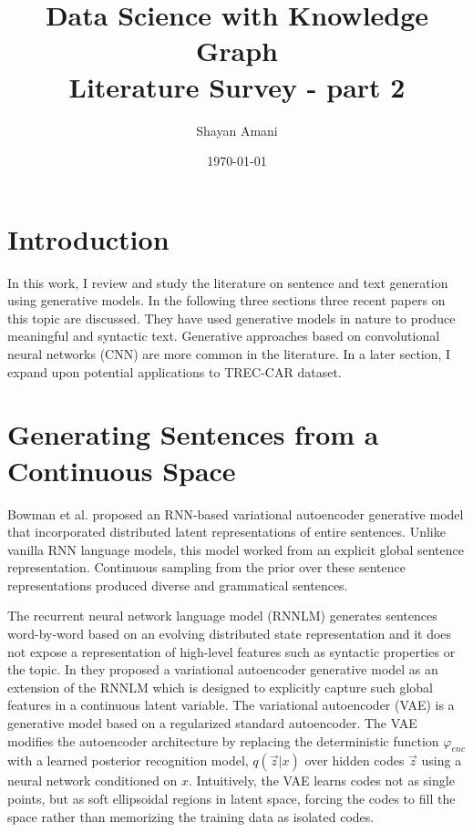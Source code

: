\documentclass[letterpaper,12pt]{article}
\title{Data Science with Knowledge Graph \\{\large Literature Survey - part 2}}
\author{Shayan Amani}
\date{\today}
\begin{document}
\maketitle

\section{Introduction}
In this work, I review and study the literature on sentence and text generation using generative models. In the following three sections three recent papers on this topic are discussed. They have used generative models in nature to produce meaningful and syntactic text. Generative approaches based on convolutional neural networks (CNN) are more common in the literature. In a later section, I expand upon potential applications to TREC-CAR dataset.

\section{Generating Sentences from a Continuous Space}
Bowman et al. \cite{Bowman2015GeneratingSpace} proposed an RNN-based variational autoencoder generative model that incorporated distributed latent representations of entire sentences. Unlike vanilla RNN language models, this model worked from an explicit global sentence representation. Continuous sampling from the prior over these sentence representations produced diverse and grammatical sentences.

The recurrent neural network language model (RNNLM) \cite{MikolovExtensionsModel} generates sentences word-by-word based on an evolving distributed state representation and it does not expose a representation of high-level features such as syntactic properties or the topic. In \cite{Bowman2015GeneratingSpace} they proposed a variational autoencoder generative model as an extension of the RNNLM which is designed to explicitly capture such global features in a continuous latent variable. The variational autoencoder (VAE) \cite{Kingma2013Auto-EncodingBayes} is a generative model based on a regularized standard autoencoder. The VAE modifies the autoencoder architecture by replacing the deterministic function $\varphi_{enc}$ with a learned posterior recognition model, $q(\vec{z}|x)$ over hidden codes $\vec{z}$ using a neural network conditioned on $x$. Intuitively, the VAE learns codes not as single points, but as soft ellipsoidal regions in latent space, forcing the codes to fill the space rather than memorizing the training data as isolated codes.
\end{document}
